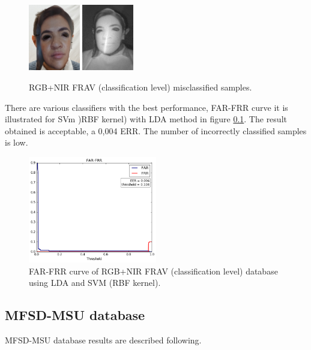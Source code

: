 \begin{figure}[htb]
\centering
\includegraphics[width=0.2\textwidth]{images_databases/frav_rgb_128.JPG}
\includegraphics[width=0.2\textwidth]{images_databases/frav_nir_128.jpg}
\caption{RGB+NIR FRAV (classification level) misclassified samples.} \label{fig:frav_clas_miscl}
\end{figure}

There are various classifiers with the best performance, FAR-FRR curve it is illustrated for SVm )RBF kernel) with LDA method in figure \ref{}. The result obtained is acceptable, a 0,004 ERR. The number of incorrectly classified samples is low.\\

\begin{figure}[htb]
\centering
\includegraphics[width=0.5\textwidth]{images/FAR-FRR/FRAV_clas_LDA_SVM_RBF_FAR_FRR.png}
\caption{FAR-FRR curve of RGB+NIR FRAV (classification level) database using LDA and SVM (RBF kernel).} \label{fig:RGB_FRAV_clas_FAR_FRR}
\end{figure}

\subsection{MFSD-MSU database}
MFSD-MSU database results are described following.\\

